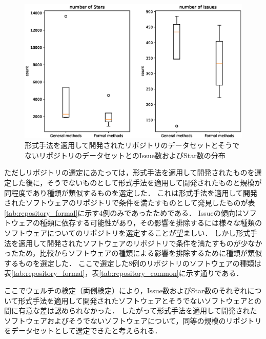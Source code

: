 \documentclass[main]{subfiles}
\begin{document}
\begin{figure}[p]
	\centering
	\includegraphics[width=\hsize]{figures/boxplot.eps}
	\caption{形式手法を適用して開発されたリポジトリのデータセットとそうでないリポジトリのデータセットとのIssue数およびStar数の分布}
	\label{fig:boxplot}
\end{figure}

ただしリポジトリの選定にあたっては，形式手法を適用して開発されたものを選定した後に，そうでないものとして形式手法を適用して開発されたものと規模が同程度であり種類が類似するものを選定した．
これは形式手法を適用して開発されたソフトウェアのリポジトリで条件を満たすものとして発見したものが表\ref{tab:repository_formal}に示す4例のみであったためである．
Issueの傾向はソフトウェアの種類に依存する可能性があり，その影響を排除するには様々な種類のソフトウェアについてのリポジトリを選定することが望ましい．
しかし形式手法を適用して開発されたソフトウェアのリポジトリで条件を満たすものが少なかったため，比較からソフトウェアの種類による影響を排除するために種類が類似するものを選定した．
ここで選定した8例のリポジトリのソフトウェアの種類は表\ref{tab:repository_formal}，表\ref{tab:repository_common}に示す通りである．

ここでウェルチの検定（両側検定）により，Issue数およびStar数のそれぞれについて形式手法を適用して開発されたソフトウェアとそうでないソフトウェアとの間に有意な差は認められなかった．
したがって形式手法を適用して開発されたソフトウェアおよびそうでないソフトウェアについて，同等の規模のリポジトリをデータセットとして選定できたと考えられる．
\end{document}
